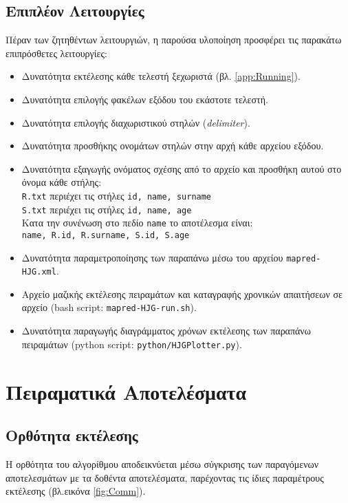 \documentclass{article}
\newcommand{\en}[1]{\foreignlanguage{english}{#1}}
\begin{document}
\subsection{Επιπλέον Λειτουργίες} \label{subsec:Extras}

Πέραν των ζητηθέντων λειτουργιών, η παρούσα υλοποίηση προσφέρει τις παρακάτω επιπρόσθετες λειτουργίες:
\begin{itemize}
\item Δυνατότητα εκτέλεσης κάθε τελεστή ξεχωριστά (βλ. \ref{app:Running}).
\item Δυνατότητα επιλογής φακέλων εξόδου του εκάστοτε τελεστή.
\item Δυνατότητα επιλογής διαχωριστικού στηλών (\emph{\en{delimiter}}).
\item Δυνατότητα προσθήκης ονομάτων στηλών στην αρχή κάθε αρχείου εξόδου.
\item Δυνατότητα εξαγωγής ονόματος σχέσης από το αρχείο και προσθήκη αυτού στο όνομα κάθε στήλης: \\ \texttt{\en{R.txt}} περιέχει τις στήλες \texttt{\en{id, name, surname}} \\
 \texttt{\en{S.txt}} περιέχει τις στήλες \texttt{\en{id, name, age}} \\
 Κατα την συνένωση στο πεδίο \texttt{\en{name}} το αποτέλεσμα είναι:\\
  \texttt{\en{name, R.id, R.surname, S.id, S.age}}
\item Δυνατότητα παραμετροποίησης των παραπάνω μέσω του αρχείου \texttt{\en{mapred-HJG.xml}}.
\item Αρχείο μαζικής εκτέλεσης πειραμάτων και καταγραφής χρονικών απαιτήσεων σε αρχείο (\en{bash script}: \texttt{\en{mapred-HJG-run.sh}}).
\item Δυνατότητα παραγωγής διαγράμματος χρόνων εκτέλεσης των παραπάνω πειραμάτων (\en{python script}: \texttt{\en{python/HJGPlotter.py}}).
\end{itemize}
\section{Πειραματικά Αποτελέσματα} \label{sec:ExpRes}
\subsection{Ορθότητα εκτέλεσης} \label{subsec:Corr}
Η ορθότητα του αλγορίθμου αποδεικνύεται μέσω σύγκρισης των παραγόμενων αποτελεσμάτων με τα δοθέντα αποτελέσματα, παρέχοντας τις ίδιες παραμέτρους εκτέλεσης (βλ.εικόνα \ref{fig:Comm}).
\end{document}
